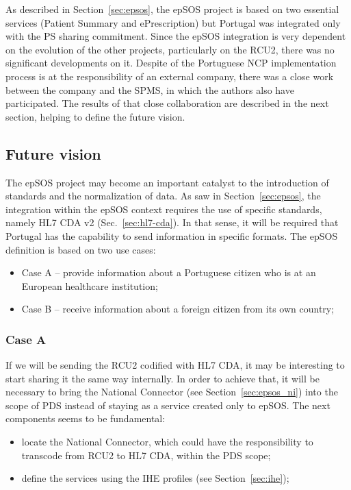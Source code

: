 As described in Section~\ref{sec:epsos}, the epSOS project is based on two essential services (Patient Summary and ePrescription) but Portugal was integrated only with the PS sharing commitment. Since the epSOS integration is very dependent on the evolution of the other projects, particularly on the RCU2, there was no significant developments on it. Despite of the Portuguese NCP implementation process is at the responsibility of an external company, there was a close work between the company and the SPMS, in which the authors also have participated. The results of that close collaboration are described in the next section, helping to define the future vision.

\subsection{Future vision}

The epSOS project may become an important catalyst to the introduction of standards and the normalization of data. As saw in Section~\ref{sec:epsos}, the integration within the epSOS context requires the use of specific standards, namely HL7 CDA v2 (Sec.~\ref{sec:hl7-cda}). In that sense, it will be required that Portugal has the capability to send information in specific formats. The epSOS definition is based on two use cases:
\begin{itemize}
\item Case A -- provide information about a Portuguese citizen who is at an European healthcare institution;
\item Case B -- receive information about a foreign citizen from its own country;
\end{itemize}


\subsubsection{Case A}

If we will be sending the RCU2 codified with HL7 CDA, it may be interesting to start sharing it the same way internally. In order to achieve that, it will be necessary to bring the National Connector (see Section~\ref{sec:epsos_ni}) into the scope of PDS instead of staying as a service created only to epSOS. The next components seems to be fundamental:
\begin{itemize}
\item locate the National Connector, which could have the responsibility to transcode from RCU2 to HL7 CDA, within the PDS scope;
\item define the services using the IHE profiles (see Section~\ref{sec:ihe}); %
\end{itemize}

